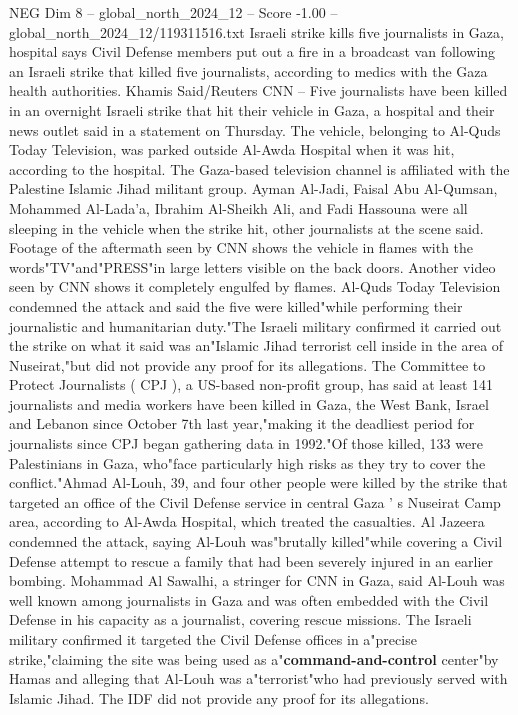 \begin{textsample}{NEG Dim 8 – global\_north\_2024\_12 – Score -1.00 – global\_north\_2024\_12/119311516.txt}  \label{ex:f8_neg_349}
Israeli strike kills five journalists in Gaza, hospital says Civil Defense members put out a fire in a broadcast van following an Israeli strike that killed five journalists, according to medics with the Gaza health authorities.
Khamis Said/Reuters CNN -- Five journalists have been killed in an overnight Israeli strike that hit their vehicle in Gaza, a hospital and their news outlet said in a statement on Thursday.
The vehicle, belonging to Al-Quds Today Television, was parked outside Al-Awda Hospital when it was hit, according to the hospital.
The Gaza-based television channel is affiliated with the Palestine Islamic Jihad militant group.
Ayman Al-Jadi, Faisal Abu Al-Qumsan, Mohammed Al-Lada'a, Ibrahim Al-Sheikh Ali, and Fadi Hassouna were all sleeping in the vehicle when the strike hit, other journalists at the scene said.
Footage of the aftermath seen by CNN shows the vehicle in flames with the words"TV"and"PRESS"in large letters visible on the back doors.
Another video seen by CNN shows it completely engulfed by flames.
Al-Quds Today Television condemned the attack and said the five were killed"while performing their journalistic and humanitarian duty."The Israeli military confirmed it carried out the strike on what it said was an"Islamic Jihad terrorist cell inside in the area of Nuseirat,"but did not provide any proof for its allegations.
The Committee to Protect Journalists ( CPJ ), a US-based non-profit group, has said at least 141 journalists and media workers have been killed in Gaza, the West Bank, Israel and Lebanon since October 7th last year,"making it the deadliest period for journalists since CPJ began gathering data in 1992."Of those killed, 133 were Palestinians in Gaza, who"face particularly high risks as they try to cover the conflict."Ahmad Al-Louh, 39, and four other people were killed by the strike that targeted an office of the Civil Defense service in central Gaza ' s Nuseirat Camp area, according to Al-Awda Hospital, which treated the casualties.
Al Jazeera condemned the attack, saying Al-Louh was"brutally killed"while covering a Civil Defense attempt to rescue a family that had been severely injured in an earlier bombing.
Mohammad Al Sawalhi, a stringer for CNN in Gaza, said Al-Louh was well known among journalists in Gaza and was often embedded with the Civil Defense in his capacity as a journalist, covering rescue missions.
The Israeli military confirmed it targeted the Civil Defense offices in a"precise strike,"claiming the site was being used as a"\textbf{command-and-control} center"by Hamas and alleging that Al-Louh was a"terrorist"who had previously served with Islamic Jihad.
The IDF did not provide any proof for its allegations.

\end{textsample}
